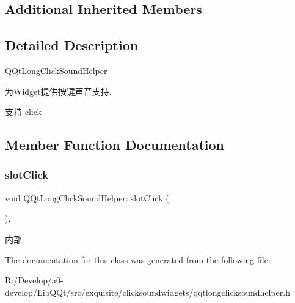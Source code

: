 \subsection*{Additional Inherited Members}


\subsection{Detailed Description}
\mbox{\hyperlink{class_q_qt_long_click_sound_helper}{Q\+Qt\+Long\+Click\+Sound\+Helper}}

为\+Widget提供按键声音支持.

支持 click 

\subsection{Member Function Documentation}
\mbox{\label{class_q_qt_long_click_sound_helper_a753866cb78009d352b61f4e903d676b6}} 
\subsubsection{\texorpdfstring{slot\+Click}{slotClick}}
{\footnotesize\ttfamily void Q\+Qt\+Long\+Click\+Sound\+Helper\+::slot\+Click (\begin{DoxyParamCaption}{ }\end{DoxyParamCaption})\hspace{0.3cm}{\ttfamily [inline]}, {\ttfamily [slot]}}

内部 

The documentation for this class was generated from the following file\+:\begin{DoxyCompactItemize}
\item 
R\+:/\+Develop/a0-\/develop/\+Lib\+Q\+Qt/src/exquisite/clicksoundwidgets/qqtlongclicksoundhelper.\+h\end{DoxyCompactItemize}
